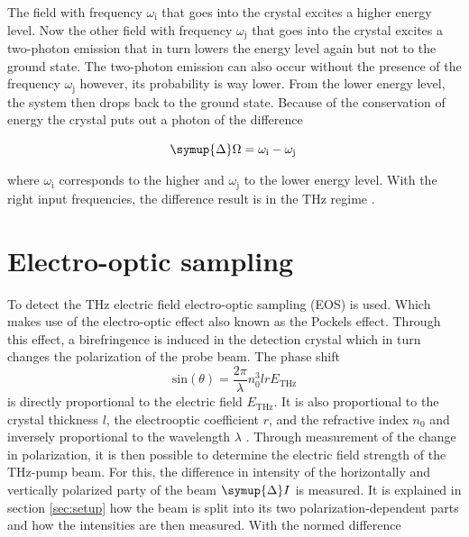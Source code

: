 The field with frequency $\omega_\text{i}$ that goes into the crystal excites a higher energy level.
Now the other field  with frequency $\omega_\text{j}$ that goes into the crystal excites a two-photon emission that in turn lowers the energy level again but not to the ground state.
The two-photon emission can also occur without the presence of the frequency $\omega_\text{j}$ however, its probability is way lower.
From the lower energy level, the system then drops back to the ground state.
Because of the conservation of energy the crystal puts out a photon of the difference

\begin{equation}
    \symup{\Delta}\Omega = \omega_\text{i} - \omega_\text{j} \,
\end{equation}

where $\omega_\text{i}$ corresponds to the higher and $\omega_\text{j}$ to the lower energy level.
With the right input frequencies, the difference result is in the $\si{\tera\hertz}$ regime \cite{boyd2020nonlinear}.



\section{Electro-optic sampling}\label{sec:eos}
To detect the $\si{\tera\hertz}$ electric field electro-optic sampling (EOS) is used.
Which makes use of the electro-optic effect also known as the Pockels effect.
Through this effect, a birefringence is induced in the detection crystal which in turn changes the polarization of the probe beam.
The phase shift 
\begin{equation}
    \text{sin}(\theta) = \frac{2\pi}{\lambda} n_0^3 l r E_\text{THz}
\end{equation}
is directly proportional to the electric field $E_\text{THz}$. 
It is also proportional to the crystal thickness $l$, the electrooptic coefficient $r$, and the refractive index $n_0$ and inversely proportional to the wavelength $\lambda$ \cite{wiki_book}. 
Through measurement of the change in polarization, it is then possible to determine the electric field strength of the $\si{\tera\hertz}$-pump beam.
For this, the difference in intensity of the horizontally and vertically polarized party of the beam $\symup{\Delta}I$ is measured.
It is explained in section \ref{sec:setup} how the beam is split into its two polarization-dependent parts and how the intensities are then measured.
With the normed difference 

